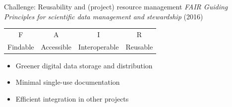 \documentclass[xcolor=table]{beamer}
\begin{document}
\begin{frame}{Challenge: Reusability and (project) resource management}
    \textit{FAIR Guiding Principles for scientific data management and stewardship} (2016)
    \begin{center}
    \begin{tabular}{|c|c|c|c|} \hline
        F & A & I & R \\
        Findable & Accessible & Interoperable & Reusable \\
        \hline
    \end{tabular}
    \end{center}
    \begin{itemize}
        \item Greener digital data storage and distribution
        \item Minimal single-use documentation
        \item Efficient integration in other projects
    \end{itemize}
\end{frame}
\end{document}
